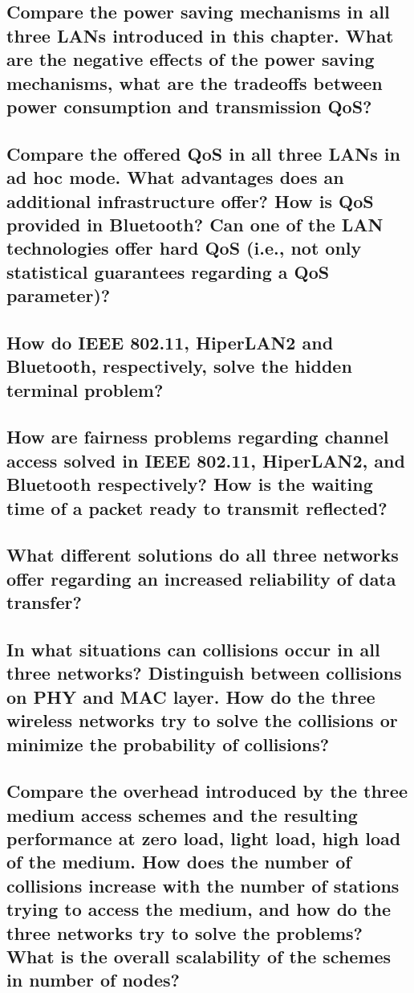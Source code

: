 \subsection{Compare the power saving mechanisms in all three LANs introduced in this chapter. What are the negative effects of the power saving mechanisms, what are the tradeoffs between power consumption and transmission QoS?}

\subsection{Compare the offered QoS in all three LANs in ad hoc mode. What advantages does an additional infrastructure offer? How is QoS provided in Bluetooth? Can one of the LAN technologies offer hard QoS (i.e., not only statistical guarantees regarding a QoS parameter)?}

\subsection{How do IEEE 802.11, HiperLAN2 and Bluetooth, respectively, solve the hidden terminal problem?}

\subsection{How are fairness problems regarding channel access solved in IEEE 802.11, HiperLAN2, and Bluetooth respectively? How is the waiting time of a packet ready to transmit reflected?}

\subsection{What different solutions do all three networks offer regarding an increased reliability of data transfer?}

\subsection{In what situations can collisions occur in all three networks? Distinguish between collisions on PHY and MAC layer. How do the three wireless networks try to solve the collisions or minimize the probability of collisions?}

\subsection{Compare the overhead introduced by the three medium access schemes and the resulting performance at zero load, light load, high load of the medium. How does the number of collisions increase with the number of stations trying to access the medium, and how do the three networks try to solve the problems? What is the overall scalability of the schemes in number of nodes?}

